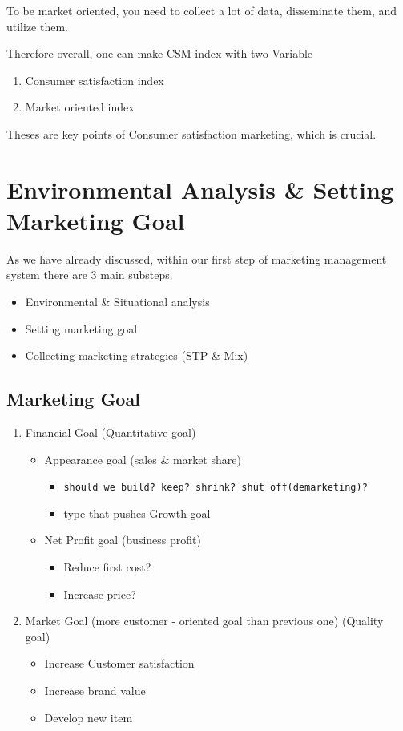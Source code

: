 \documentclass[12pt]{article}
\begin{document}
To be market oriented, you need to collect a lot of data, disseminate them, and utilize them.

Therefore overall, one can make CSM index with two Variable
\begin{enumerate}
	\item Consumer satisfaction index
	\item Market oriented index
\end{enumerate}

Theses are key points of Consumer satisfaction marketing, which is crucial.

\section{Environmental Analysis \& Setting Marketing Goal}


As we have already discussed, within our first step of marketing management system there are 3 main substeps.
\begin{itemize}
	\item Environmental \& Situational analysis
	\item Setting marketing goal
	\item Collecting marketing strategies (STP \& Mix)
\end{itemize}

\subsection{Marketing Goal}

\begin{enumerate}
	\item Financial Goal (Quantitative goal)
	\begin{itemize}
		\item Appearance goal (sales \& market share)
		\begin{itemize}
			\item \texttt{should we build? keep? shrink? shut off(demarketing)?}
			\item type that pushes Growth goal
		\end{itemize}
		\item Net Profit goal (business profit)
		\begin{itemize}
			\item Reduce first cost?
			\item Increase price?
		\end{itemize}
	\end{itemize}
	\item Market Goal (more customer - oriented goal than previous one) (Quality goal)
	\begin{itemize}
		\item Increase Customer satisfaction
		\item Increase brand value
		\item Develop new item
	\end{itemize}
\end{enumerate}
\end{document}
